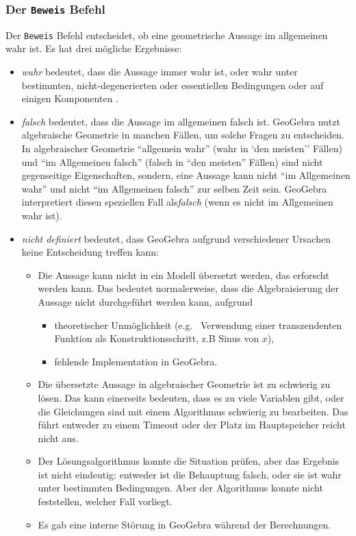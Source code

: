 \documentclass{article}
\begin{document}
\subsubsection{Der \texttt{Beweis} Befehl}
Der \texttt{Beweis} Befehl entscheidet, ob eine geometrische Aussage im allgemeinen wahr ist. Es hat drei mögliche Ergebnisse:
\begin{itemize}
    \item \textit{wahr} bedeutet, dass die Aussage immer wahr ist, oder wahr unter bestimmten, nicht-degenerierten \cite{Chou} oder essentiellen \cite{KovacsRecioSolyomGecse} Bedingungen oder auf einigen Komponenten \cite{ZhouWangSun}.
    \item \textit{falsch} bedeutet, dass die Aussage im allgemeinen falsch ist. GeoGebra nutzt algebraische Geometrie in manchen Fällen, um solche Fragen zu entscheiden. In algebraischer Geometrie ``allgemein wahr'' (wahr in `den meisten'' Fällen) und ``im Allgemeinen falsch'' (falsch in ``den meisten'' Fällen) sind nicht gegenseitige Eigenschaften, sondern, eine Aussage kann nicht ``im Allgemeinen wahr'' und nicht ``im Allgemeinen falsch'' zur selben Zeit sein. GeoGebra interpretiert diesen speziellen Fall als\textit{falsch} (wenn es nicht im Allgemeinen wahr ist).
    \item \textit{nicht definiert} bedeutet, dass GeoGebra aufgrund verschiedener Ursachen keine Entscheidung treffen kann:
    \begin{itemize}
        \item Die Aussage kann nicht in ein Modell übersetzt werden, das erforscht werden kann. Das bedeutet normalerweise, dass die Algebraisierung der Aussage nicht durchgeführt werden kann, aufgrund
        \begin{itemize}
            \item theoretischer Unmöglichkeit (e.g.~ Verwendung einer transzendenten Funktion als Konstruktionsschritt, z.B Sinus von $x$),
            \item fehlende Implementation in GeoGebra.
        \end{itemize}
        \item Die übersetzte Aussage in algebraischer Geometrie ist zu schwierig zu lösen. Das kann einerseits bedeuten, dass es zu viele Variablen gibt, oder die Gleichungen sind mit einem Algorithmus schwierig zu bearbeiten. Das führt entweder zu einem Timeout oder der Platz im Hauptspeicher reicht nicht aus.
        \item Der Lösungsalgorithmus konnte die Situation prüfen, aber das Ergebnis ist nicht eindeutig: entweder ist die Behauptung falsch, oder sie ist wahr unter bestimmten Bedingungen. Aber der Algorithmus konnte nicht feststellen, welcher Fall vorliegt.
        \item Es gab eine interne Störung in GeoGebra während der Berechnungen.
    \end{itemize}
\end{itemize}
\end{document}
